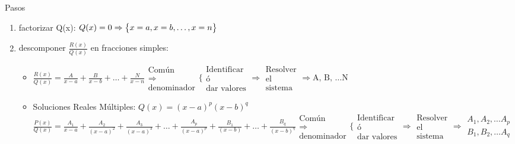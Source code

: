 \documentclass[a4paper,11pt]{article}
\begin{document}
				Pasos
			\begin{enumerate}
				\item factorizar Q(x): $ Q(x) = 0 \Rightarrow
					\big{ \{ } 
						x = a, 
						x = b, 
						\dots,
						x = n 
					\big{ \} } $
				\item descomponer $ \frac{R(x)}{Q(x)} $ en fracciones simples:
					\begin{itemize}
						\item $ \frac{R(x)}{Q(x)} = \frac{A}{x-a} + \frac{B}{x-b}
							+ \dots + \frac{N}{x-n}
							\begin{array}{c}
								\text{Común}\\
								\Rightarrow\\
								\text{denominador}
							\end{array}
							\Bigg \{ %
							\begin{array}{c}
								\text{Identificar}\\
								\text{ó}\\
								\text{dar valores}
							\end{array}
							\Rightarrow
							\begin{array}{c}
								\text{Resolver}\\
								\text{el}\\
								\text{sistema}
							\end{array} \Rightarrow \text{A, B, } \dots \text{N}$

						\item Soluciones Reales Múltiples: $ Q(x) = (x-a)^p (x-b)^q $
							$ \frac{P(x)}{Q(x)} = \frac{A_1}{x-a} +
							\frac{A_2}{(x-a)^2} + \frac{A_3}{(x-a)^3} + \dots +
							\frac{A_p}{(x-a)^p} + \frac{B_1}{(x-b)} + \dots +
							\frac{B_q}{(x-b)^q} 
							\begin{array}{c}
								\text{Común}\\
								\Rightarrow\\
								\text{denominador}
							\end{array}
							\Bigg \{
							\begin{array}{c}
								\text{Identificar}\\
								\text{ó}\\
								\text{dar valores}
							\end{array}
							\Rightarrow
							\begin{array}{c}
								\text{Resolver}\\
								\text{el}\\
								\text{sistema}
							\end{array} \Rightarrow 
							\begin{array}{l}
								A_1, A_2, \dots A_p\\
								B_1, B_2, \dots A_q
							\end{array}$


\end{itemize}
\end{enumerate}
\end{document}
